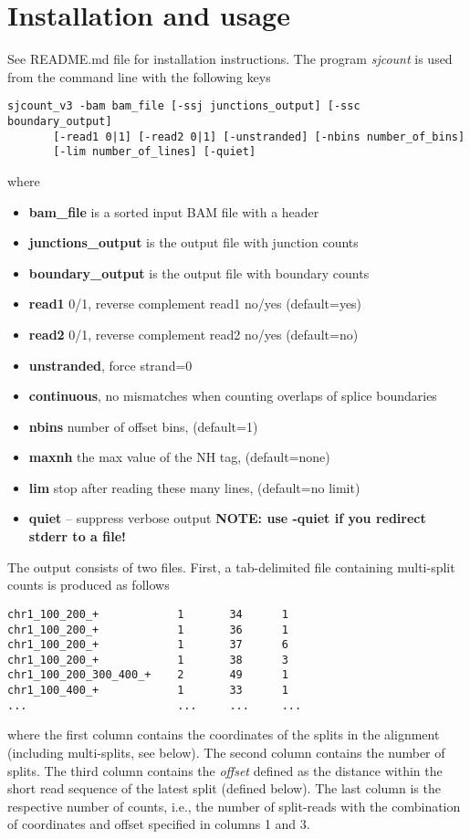 \documentclass{article}
\begin{document}
\section{Installation and usage}
See README.md file for installation instructions. The program {\em sjcount} is used from the command line with the following keys
\begin{verbatim}
sjcount_v3 -bam bam_file [-ssj junctions_output] [-ssc boundary_output]
       [-read1 0|1] [-read2 0|1] [-unstranded] [-nbins number_of_bins]
       [-lim number_of_lines] [-quiet]
\end{verbatim}
where
\begin{itemize}
\item {\bf bam\_file} is a sorted input BAM file with a header
\item {\bf junctions\_output} is the output file with junction counts
\item {\bf boundary\_output} is the output file with boundary counts
\item {\bf read1} 0/1, reverse complement read1 no/yes (default=yes)
\item {\bf read2} 0/1, reverse complement read2 no/yes (default=no)
\item {\bf unstranded}, force strand=0
\item {\bf continuous}, no mismatches when counting overlaps of splice boundaries
\item {\bf nbins} number of offset bins, (default=1)
\item {\bf maxnh} the max value of the NH tag, (default=none)
\item {\bf lim} stop after reading these many lines, (default=no limit)
\item {\bf quiet} -- suppress verbose output {\bf NOTE: use -quiet if you redirect stderr to a file!}
\end{itemize}

The output consists of two files. First, a tab-delimited file containing multi-split counts is produced as follows
\begin{verbatim}
chr1_100_200_+            1       34      1
chr1_100_200_+            1       36      1
chr1_100_200_+            1       37      6
chr1_100_200_+            1       38      3
chr1_100_200_300_400_+    2       49      1
chr1_100_400_+            1       33      1
...                       ...     ...     ...
\end{verbatim}
where the first column contains the coordinates of the splits in the alignment (including multi-splits, see below). 
The second column contains the number of splits. The third column contains the {\em offset} defined as the distance within 
the short read sequence of the latest split (defined below). The last column is the respective number of counts, i.e., the 
number of split-reads with the combination of coordinates and offset specified in columns 1 and 3.
\end{document}

